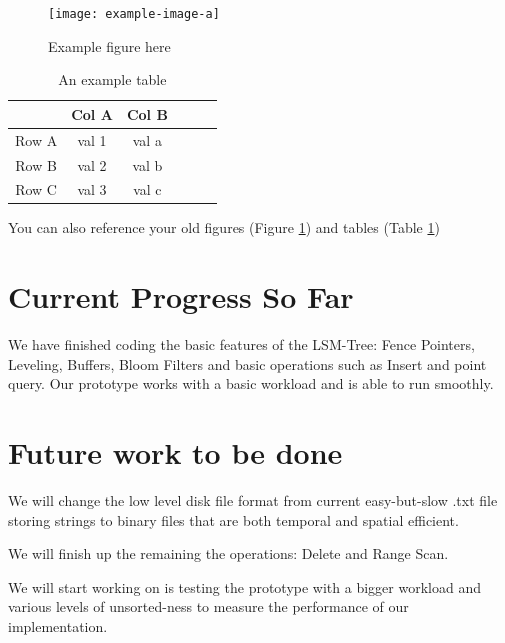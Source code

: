 \documentclass[sigconf]{acmart}
\begin{document}
    \begin{figure}[ht]
        \texttt{[image: example-image-a]}
        \caption{Example figure here}
        \label{fig:filler}
    \end{figure}

    \begin{table}[H]
        \caption{An example table}
        \label{tab:ex}
        \centering

        \begin{tabular}{c |c c c c c}
            \hline\hline
            & Col A & Col B \\
            \hline
            Row A & val 1 & val a \\
            Row B & val 2 & val b \\
            Row C & val 3 & val c \\
            \hline
        \end{tabular}
    \end{table}

    You can also reference your old figures (Figure \ref{fig:filler}) and tables
    (Table \ref{tab:ex})

    \section{Current Progress So Far}

    We have finished coding the basic features of the LSM-Tree: Fence Pointers, Leveling, Buffers, Bloom Filters and basic operations such as Insert and point query. Our prototype works with a basic workload and is able to run smoothly.

    \section{Future work to be done}

    We will change the low level disk file format from current easy-but-slow .txt file storing strings to binary files that are both temporal and spatial efficient.

    We will finish up the remaining the operations: Delete and Range Scan.

    We will start working on is testing the prototype with a bigger workload and various levels of unsorted-ness to measure the performance of our implementation.
\end{document}
